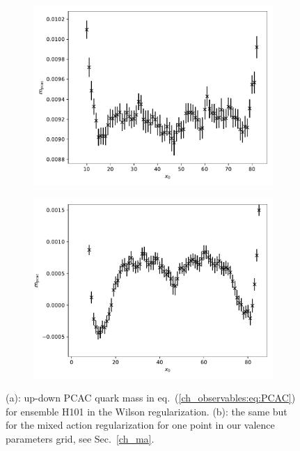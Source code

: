 \begin{figure}
    \centering
    \begin{subfigure}{1.\textwidth}
    	\includegraphics[width=\textwidth]{./cap3/figs/mpcac_H101.pdf}
    	\caption{}
    \end{subfigure}
    \begin{subfigure}{1.\textwidth}
    	\includegraphics[width=\textwidth]{./cap3/figs/mpcac_tm_H101.pdf}
    	\caption{}
    \end{subfigure}
    \caption{(a): up-down PCAC quark mass in eq.~(\ref{ch_observables:eq:PCAC}) for ensemble H101 in the Wilson regularization. (b): the same but for the mixed action regularization for one point in our valence parameters grid, see Sec.~\ref{ch_ma}.}
        \label{ch_observables:fig:mpcac}
\end{figure}

